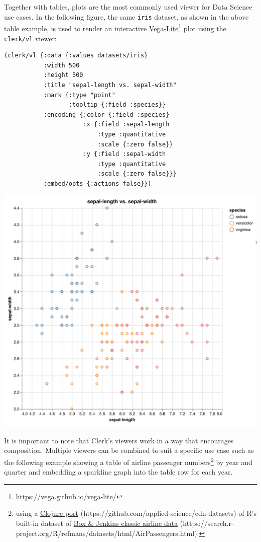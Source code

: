 \documentclass[sigconf,screen,pbalance=true]{acmart}
\newcommand{\passthrough}[1]{#1}
\begin{document}
Together with tables, plots are the most commonly used viewer for Data Science use cases. In the following figure, the same \passthrough{\lstinline!iris!} dataset, as shown in the above table example, is used to render an interactive {\href{https://vega.github.io/vega-lite/}{Vega-Lite}\footnote{https://vega.github.io/vega-lite/}} plot using the \passthrough{\lstinline!clerk/vl!} viewer:

\begin{minipage}{\linewidth}
\begin{lstlisting}
(clerk/vl {:data {:values datasets/iris}
           :width 500
           :height 500
           :title "sepal-length vs. sepal-width"
           :mark {:type "point"
                  :tooltip {:field :species}}
           :encoding {:color {:field :species}
                      :x {:field :sepal-length
                          :type :quantitative
                          :scale {:zero false}}
                      :y {:field :sepal-width
                          :type :quantitative
                          :scale {:zero false}}}
           :embed/opts {:actions false}})
\end{lstlisting}
\end{minipage}

\includegraphics{images/anon-expr-5dtjeGHWCqJb9X8RfQtspB6Cyeo8Yv-result.png}

It is important to note that Clerk's viewers work in a way that encourages composition. Multiple viewers can be combined to suit a specific use case such as the following example showing a table of airline passenger numbers\footnote{using a {\href{https://github.com/applied-science/edn-datasets}{Clojure port} (https://github.com/applied-science/edn-datasets)} of R's built-in dataset of {\href{https://search.r-project.org/R/refmans/datasets/html/AirPassengers.html}{Box \& Jenkins classic airline data} (https://search.r-project.org/R/refmans/datasets/html/AirPassengers.html)}.} by year and quarter and embedding a sparkline graph into the table row for each year.
\end{document}

